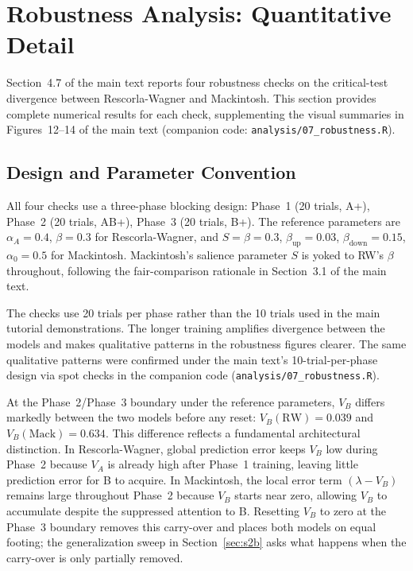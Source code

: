 \documentclass[11pt,a4paper]{article}
\begin{document}
\clearpage



\section{Robustness Analysis: Quantitative Detail}
\label{sec:s2}

Section~4.7 of the main text reports four robustness checks on the critical-test divergence between Rescorla-Wagner and Mackintosh. This section provides complete numerical results for each check, supplementing the visual summaries in Figures~12--14 of the main text (companion code: \texttt{analysis/07\_robustness.R}).

\subsection{Design and Parameter Convention}
\label{sec:s2_design}

All four checks use a three-phase blocking design: Phase~1 (20 trials, A+), Phase~2 (20 trials, AB+), Phase~3 (20 trials, B+). The reference parameters are $\alpha_A = 0.4$, $\beta = 0.3$ for Rescorla-Wagner, and $S = \beta = 0.3$, $\beta_{\text{up}} = 0.03$, $\beta_{\text{down}} = 0.15$, $\alpha_0 = 0.5$ for Mackintosh. Mackintosh's salience parameter $S$ is yoked to RW's $\beta$ throughout, following the fair-comparison rationale in Section~3.1 of the main text.

The checks use 20 trials per phase rather than the 10 trials used in the main tutorial demonstrations. The longer training amplifies divergence between the models and makes qualitative patterns in the robustness figures clearer. The same qualitative patterns were confirmed under the main text's 10-trial-per-phase design via spot checks in the companion code (\texttt{analysis/07\_robustness.R}).

At the Phase~2/Phase~3 boundary under the reference parameters, $V_B$ differs markedly between the two models before any reset: $V_B(\text{RW}) = 0.039$ and $V_B(\text{Mack}) = 0.634$. This difference reflects a fundamental architectural distinction. In Rescorla-Wagner, global prediction error keeps $V_B$ low during Phase~2 because $V_A$ is already high after Phase~1 training, leaving little prediction error for B to acquire. In Mackintosh, the local error term $(\lambda - V_B)$ remains large throughout Phase~2 because $V_B$ starts near zero, allowing $V_B$ to accumulate despite the suppressed attention to B. Resetting $V_B$ to zero at the Phase~3 boundary removes this carry-over and places both models on equal footing; the generalization sweep in Section~\ref{sec:s2b} asks what happens when the carry-over is only partially removed.
\end{document}
